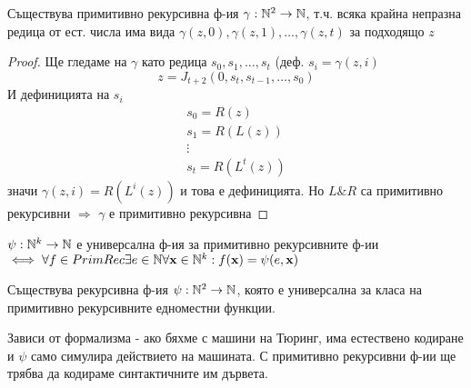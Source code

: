 \begin{lemma}[Гьодел]
    Съществува примитивно рекурсивна ф-ия $\gamma: {\mathbb{N}}^2 \to {\mathbb{N}}$, т.ч. всяка крайна непразна редица от ест. числа има вида $\gamma(z, 0), \gamma(z, 1), \dots, \gamma(z, t)$ за подходящо $z$
\end{lemma}
\begin{proof}
    Ще гледаме на $\gamma$ като редица $s_0, s_1, \dots, s_t$ (деф. $s_i = \gamma(z, i)$ 
    \begin{equation*}
        z = J_{t+2}(0, s_t, s_{t-1}, \dots, s_0)
    \end{equation*}
    И дефиницията на $s_i$
    \begin{equation*}
        \begin{split}
            s_0 = R(z) \\
            s_1 = R(L(z)) \\
            \vdots \\
            s_t = R(L^t(z))
        \end{split}
    \end{equation*}
    значи $\gamma(z, i) = R(L^i(z))$ и това е дефиницията. Но $L \& R$ са примитивно рекурсивни $\Rightarrow$ $\gamma$ е примитивно рекурсивна
\end{proof}

\begin{definition}
    $\psi : {\mathbb{N}}^{k} \to {\mathbb{N}}$ е универсална ф-ия за примитивно рекурсивните ф-ии $\iff \forall f \in PrimRec \exists e \in {\mathbb{N}} \forall \textbf{x} \in {\mathbb{N}}^k: f(\textbf{x}) = \psi(e, \textbf{x})$ 
\end{definition}

\begin{proposition}
    Съществува рекурсивна ф-ия $\psi: {\mathbb{N}}^2 \to {\mathbb{N}}$, която е универсална за класа на примитивно рекурсивните едноместни функции. 
\end{proposition}
Зависи от формализма - ако бяхме с машини на Тюринг, има естествено кодиране и $\psi$ само симулира действието на машината. С примитивно рекурсивни ф-ии ще трябва да кодираме синтактичните им дървета.

